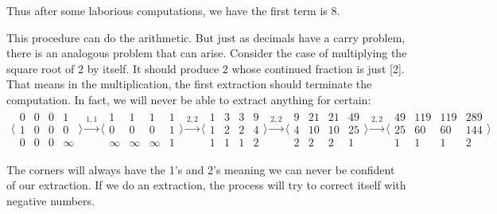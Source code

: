 \documentclass[12pt]{article}
\begin{document}
Thus after some laborious computations, we have the first term is 8. 

This procedure can do the arithmetic. But just as decimals have a carry problem, there is an analogous problem that can arise. Consider the case of multiplying the square root of 2 by itself. It should produce 2 whose continued fraction is just [2]. That means in the multiplication, the first extraction should terminate the computation. In fact, we will never be able to extract anything for certain: 
\begin{multline*}
 \big\langle\begin{smallmatrix}
  0 & 0 & 0 & 1\\
  1 & 0 & 0 & 0\\
  0 & 0 & 0 & \infty
\end{smallmatrix}\big\rangle
\xrightarrow{1, 1}
 \big\langle\begin{smallmatrix}
  1 & 1 & 1 & 1\\
  0 & 0 & 0 & 1\\
  \infty & \infty & \infty & 1
\end{smallmatrix}\big\rangle
\xrightarrow{2, 2}
 \big\langle\begin{smallmatrix}
  1 & 3 & 3 & 9\\
  1 & 2 & 2 & 4\\
  1 & 1 & 1 & 2
\end{smallmatrix}\big\rangle
\xrightarrow{2, 2}
 \big\langle\begin{smallmatrix}
  9 & 21 & 21 & 49\\
  4 & 10 & 10 & 25\\
  2 & 2 & 2 & 1
\end{smallmatrix}\big\rangle
\xrightarrow{2, 2}
 \big\langle\begin{smallmatrix}
  49 & 119 & 119 & 289\\
  25 & 60 & 60 & 144\\
  1 & 1 & 1 & 2
\end{smallmatrix}\big\rangle
\end{multline*}

The corners will always have the 1's and 2's meaning we can never be confident of our extraction. If we do an extraction, the process will try to correct itself with negative numbers. 
\end{document}
